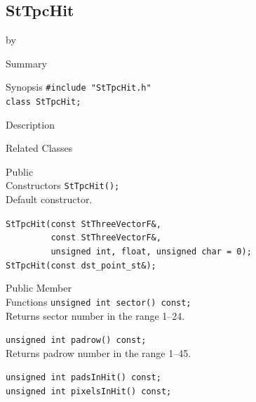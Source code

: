 \documentclass[twoside]{article}
\newcommand{\entrylabel}[1]{\mbox{\textbf{{#1}}}\hfil}%
\newenvironment{entry}
{\begin{list}{}%
    {\renewcommand{\makelabel}{\entrylabel}%
     \setlength{\labelwidth}{90pt}%
     \setlength{\leftmargin}{\labelwidth}
     \advance\leftmargin by \labelsep%
      }%
    }%
  {\end{list}}
\newcommand{\Entrylabel}[1]%
{\raisebox{0pt}[1ex][0pt]{\makebox[\labelwidth][l]%
    {\parbox[t]{\labelwidth}{\hspace{0pt}\textbf{{#1}}}}}}
\newenvironment{Entry}%
{\renewcommand{\entrylabel}{\Entrylabel}\begin{entry}}%
  {\end{entry}}
\begin{document}
\subsection{StTpcHit}
\label{sec:StTpcHit}
\begin{Entry}
\item[Summary]
\item[Synopsis]
    \verb+#include "StTpcHit.h"+\\
    \verb+class StTpcHit;+\\
\item[Description]
\item[Related Classes]
\item[Public\\ Constructors]
    \verb+StTpcHit();+\\
    Default constructor.
    
    \verb+StTpcHit(const StThreeVectorF&,+\\
    \verb+         const StThreeVectorF&,+\\
    \verb+         unsigned int, float, unsigned char = 0);+\\
    
    \verb+StTpcHit(const dst_point_st&);+\\
    
\item[Public Member\\ Functions]
    \verb+unsigned int sector() const;+\\
    Returns sector number in the range 1--24.
    
    \verb+unsigned int padrow() const;+\\
    Returns padrow number in the range 1--45.

    \verb+unsigned int padsInHit() const;+\\
    
    \verb+unsigned int pixelsInHit() const;+\\
\end{Entry}
\clearpage
\end{document}
